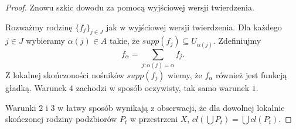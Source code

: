 \begin{proof}
  Znowu szkic dowodu za pomocą wyjściowej wersji twierdzenia.

  Rozważmy rodzinę $\{f_j\}_{j\in J}$ jak w wyjściowej wersji twierdzenia. Dla każdego $j\in J$ wybieramy $\alpha(j)\in A$ takie, że $supp(f_j)\subseteq U_{\alpha(j)}$. Zdefiniujmy
  $$f_\alpha=\sum_{j:\alpha(j)=\alpha}f_j.$$
  Z lokalnej skończoności nośników $supp(f_j)$ wiemy, że $f_\alpha$ również jest funkcją gładką. Warunek $4$ zachodzi w sposób oczywisty, tak samo warunek $1$.

  Warunki $2$ i $3$ w łatwy sposób wynikają z obserwacji, że dla dowolnej lokalnie skończonej rodziny podzbiorów $P_t$ w przestrzeni $X$, $cl(\bigcup P_t)=\bigcup cl(P_t)$.
\end{proof}
